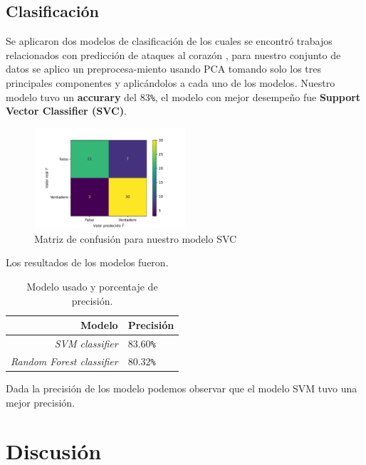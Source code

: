 \documentclass[10pt,journal]{IEEEtran}
\begin{document}
\subsection{Clasificación}

Se aplicaron dos modelos de clasificación de los cuales se encontró trabajos relacionados con predicción de ataques al corazón \cite{Pal_2021} \cite{8684835}, para nuestro conjunto de datos se aplico un preprocesa-miento usando PCA tomando solo los tres principales componentes y aplicándolos a cada uno de los modelos. Nuestro modelo tuvo un \textbf{accurary} del 83\verb|%|, el modelo con mejor desempeño fue \textbf{Support Vector Classifier (SVC)}.

\begin{figure}[ht]
    \centering
    \includegraphics[width=0.5\textwidth,height=0.5\textheight,keepaspectratio]{cfm.pdf}
    \caption{ Matriz de confusión para nuestro modelo SVC} 
    \label{fig:fcm_matriz}
\end{figure}


Los resultados de los modelos fueron.

\begin{table}[th]
    \caption{Modelo usado y porcentaje de precisión.}
    \label{tab:ts_example}
    \begin{center}
    \begin{tabular}{|r|l|}
    \hline
       Modelo & Precisión  \\
   \hline
    \textit{SVM classifier} &  83.60\verb|%|  \\

    \hline
    \textit{Random Forest classifier} &  80.32\verb|%|  \\
   \hline
    \end{tabular}
    \end{center}
\end{table}

Dada la precisión de los modelo podemos observar que el modelo SVM tuvo una mejor precisión.



\section{Discusión}
\end{document}
